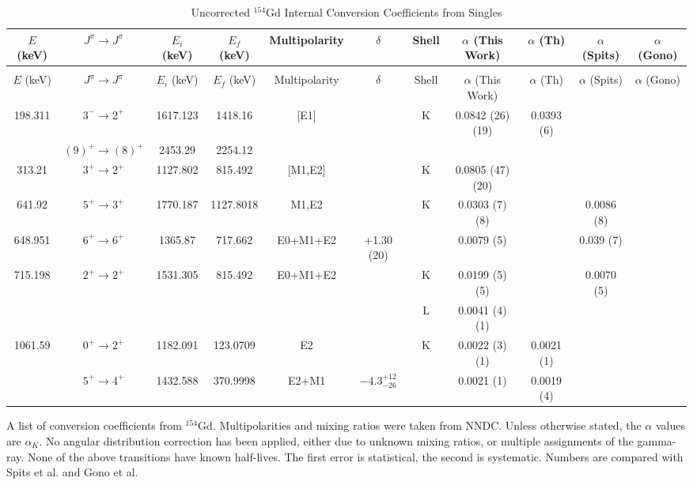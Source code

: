 \begin{sidewaystable}
    \begin{longtable}{c|c|c|c|c|c|c|c|c|c|c}
        \caption{Uncorrected $^{154}$Gd Internal Conversion Coefficients from Singles}
        \label{tab:154Gd_Single_ICC_Uncorr}\\
        \toprule
        $E$ (keV)	&	$J^{\pi}	\rightarrow	J^{\pi}$	&	$E_i$ (keV)	&	$E_f$ (keV)	&	Multipolarity	&	$\delta$ & Shell	&	$\alpha$ (This Work)				&	$\alpha$  (Th)	&	$\alpha$ (Spits) & $\alpha$ (Gono)		\\
        \hline
        \endfirsthead
        \caption[]{Uncorrected $^{154}$Gd Internal Conversion Coefficients from Singles}\\
        \toprule
        $E$ (keV)	&	$J^{\pi}	\rightarrow	J^{\pi}$	&	$E_i$ (keV)	&	$E_f$ (keV)	&	Multipolarity	&	$\delta$ & Shell	&	$\alpha$ (This Work) 			&	$\alpha$  (Th)	&	$\alpha$ (Spits) & $\alpha$ (Gono)	\\
        \hline
	    \endhead
	    \hline
        198.311	&	$3^-	\rightarrow	2^+$	&	1617.123	&	1418.16		&	[E1]	&		& K &	0.0842	(26) (19)	&	0.0393 (6)	&		\\
	    &	$(9)^+	\rightarrow	(8)^+$	&	2453.29	&	2254.12		&		&		&					&		&		\\
	    \hline
        313.21	&	$3^+	\rightarrow	2^+$	&	1127.802	&	815.492		&	[M1,E2]	&	 & K	&	0.0805	(47) (20)	&		&		\\
        \hline
        641.92	&	$5^+	\rightarrow	3^+$	&	1770.187	&	1127.8018		&	M1,E2	&		& K &	0.0303 (7) (8)	&		&	0.0086 (8)	\\
        648.951	&	$6^+	\rightarrow	6^+$	&	1365.87	&	717.662		&	E0+M1+E2	&	+1.30 (20)	&		&	0.0079 (5)	&	& 0.039 (7)	\\
        \hline
        715.198	&	$2^+	\rightarrow	2^+$	&	1531.305	&	815.492		&	E0+M1+E2	&		& K &	0.0199	(5) (5)	&		&	0.0070 (5)	\\
	    &				&		&			&		&		& L &	0.0041	(4) (1)	&		&		\\
	    \hline
        1061.59	&	$0^+	\rightarrow	2^+$	&	1182.091	&	123.0709		&	E2	&		& K &	0.0022	(3) (1)	&	0.0021 (1)	&		\\
	    &	$5^+	\rightarrow	4^+$	&	1432.588	&	370.9998		&	E2+M1	&	$-4.3^{+12}_{-26}$	&			&	0.0021 (1)	&	0.0019 (4)	\\
        \bottomrule
    \end{longtable}
    \item{A list of conversion coefficients from $^{154}$Gd. Multipolarities and mixing ratios were taken from NNDC. Unless otherwise stated, the $\alpha$ values are $\alpha_K$. No angular distribution correction has been applied, either due to unknown mixing ratios, or multiple assignments of the gamma-ray. None of the above transitions have known half-lives. The first error is statistical, the second is systematic. Numbers are compared with Spits et al.\citep{spits96:_154gd} and Gono et al.\citep{gono74:_154gd_e0}}
\end{sidewaystable}